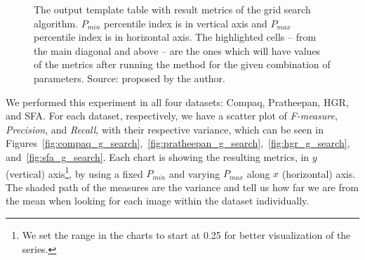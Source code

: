 \begin{figure}[ht]
    \centering

    \caption[The output template table with result metrics of the grid search algorithm]{The output template table with result metrics of the grid search algorithm. $P_{min}$ percentile index is in vertical axis and $P_{max}$ percentile index is in horizontal axis. The highlighted cells -- from the main diagonal and above -- are the ones which will have values of the metrics after running the method for the given combination of parameters. Source: proposed by the author.}
    \label{fig:gs_table_output}
\end{figure}

We performed this experiment in all four datasets: Compaq, Pratheepan, HGR, and SFA. For each dataset, respectively, we have a scatter plot of \emph{F-measure}, \emph{Precision}, and \emph{Recall}, with their respective variance, which can be seen in Figures~\ref{fig:compaq_g_search},~\ref{fig:pratheepan_g_search},~\ref{fig:hgr_g_search}, and~\ref{fig:sfa_g_search}. Each chart is showing the resulting metrics, in $y$ (vertical) axis\footnote{We set the range in the charts to start at 0.25 for better visualization of the series.
}, by using a fixed $P_{min}$ and varying $P_{max}$ along $x$ (horizontal) axis. The shaded path of the measures are the variance and tell us how far we are from the mean when looking for each image within the dataset individually.

